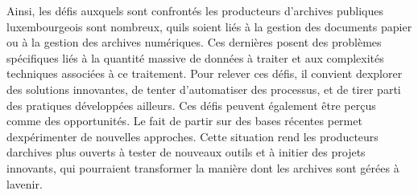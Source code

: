 Ainsi, les défis auxquels sont confrontés les producteurs d'archives
publiques luxembourgeois sont nombreux, qu\textquotesingle ils soient
liés à la gestion des documents papier ou à la gestion des archives
numériques. Ces dernières posent des problèmes spécifiques liés à la
quantité massive de données à traiter et aux complexités techniques
associées à ce traitement. Pour relever ces défis, il convient
d\textquotesingle explorer des solutions innovantes, de tenter
d'automatiser des processus, et de tirer parti des pratiques développées
ailleurs. Ces défis peuvent
également être perçus comme des opportunités. Le fait de partir sur des
bases récentes permet d\textquotesingle expérimenter de nouvelles
approches. Cette situation rend les producteurs
d\textquotesingle archives plus ouverts à tester de nouveaux outils et à
initier des projets innovants, qui pourraient transformer la manière
dont les archives sont gérées à l\textquotesingle avenir.




